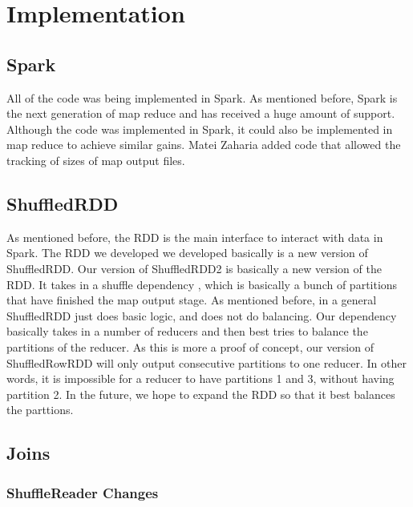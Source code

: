 \chapter{Implementation}\label{intro-ch}

\section{Spark}

All of the code was being implemented in Spark. As mentioned before, Spark is the next 
generation of map reduce and has received a huge amount of support. Although the code was implemented in Spark, 
it could also be implemented in map reduce to achieve similar gains. Matei Zaharia added code 
that allowed the tracking of sizes of map output files.   

\section{ShuffledRDD}

As mentioned before, the RDD is the main interface to interact with data in Spark.
The RDD we developed we developed basically is a new version of ShuffledRDD. Our version
of ShuffledRDD2 is basically a new version of the RDD. It takes in a shuffle dependency
, which is basically a bunch of partitions that have finished the map output stage. As mentioned before,
in a general ShuffledRDD just does basic logic, and does not do balancing. Our dependency
basically takes in a number of reducers and then best tries to balance the partitions of the reducer.
As this is more a proof of concept, our version of ShuffledRowRDD will only output consecutive partitions to one
reducer. In other words, it is impossible for a reducer to have partitions 1 and 3, without having partition 2. 
In the future, we hope to expand the RDD so that it best balances the parttions.

\section{Joins}

\subsection{ShuffleReader Changes}

